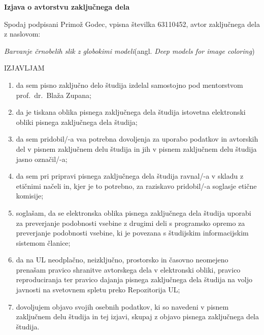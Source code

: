 \documentclass[a4paper, 12pt]{book}
\begin{document}

\pagestyle{empty}
\begin{center}
{\Large\textbf{\sc Izjava o avtorstvu zaključnega dela}}
\end{center}
%
\vspace{1mm}
\noindent Spodaj podpisani Primož Godec, vpisna številka 63110452, avtor zaključnega dela z naslovom:

\vspace{1mm}
\noindent\emph{Barvanje črnobelih slik z globokimi modeli}\hspace{5mm}(angl. \emph{Deep models for image coloring})

\vspace{1mm}
\begin{center}IZJAVLJAM\end{center}
\begin{enumerate}
\setlength\itemsep{0mm}
\item da sem pisno zaključno delo študija izdelal samostojno pod mentorstvom prof.\ dr.\ Blaža Zupana;
\item da je tiskana oblika pisnega zaključnega dela študija istovetna elektronski obliki pisnega zaključnega dela študija;
\item da sem pridobil/-a vsa potrebna dovoljenja za uporabo podatkov in avtorskih del v pisnem zaključnem delu študija in jih v pisnem zaključnem delu študija jasno označil/-a;
\item da sem pri pripravi pisnega zaključnega dela študija ravnal/-a v skladu z etičnimi načeli in, kjer je to potrebno, za raziskavo pridobil/-a soglasje etične komisije;
\item soglašam, da se elektronska oblika pisnega zaključnega dela študija uporabi za preverjanje podobnosti vsebine z drugimi deli s programsko opremo za preverjanje podobnosti vsebine, ki je povezana s študijskim informacijskim sistemom članice;
\item da na UL neodplačno, neizključno, prostorsko in časovno neomejeno prenašam pravico shranitve avtorskega dela v elektronski obliki, pravico reproduciranja ter pravico dajanja pisnega zaključnega dela študija na voljo javnosti na svetovnem spletu preko Repozitorija UL;
\item dovoljujem objavo svojih osebnih podatkov, ki so navedeni v pisnem zaključnem delu študija in tej izjavi, skupaj z objavo pisnega zaključnega dela študija.
\end{enumerate}
\end{document}
